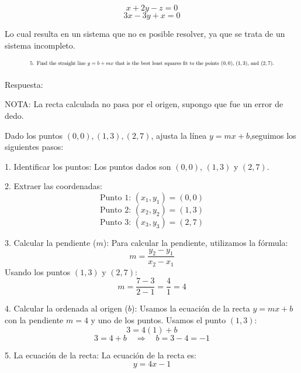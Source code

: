 \documentclass[12pt]{report}
\begin{document}
\[
x + 2y - z = 0
\]
\[
3x - 3y + x = 0
\]

Lo cual resulta en un sistema que no es posible resolver, ya que se trata de un sistema incompleto.



\begin{figure}[H]
	\centering
	\includegraphics[width=1\textwidth]{inciso5}
\end{figure}
	Respuesta:
	
	NOTA: La recta calculada no pasa por el origen, supongo que fue un error de dedo.
	
	Dado los puntos \( (0, 0), (1, 3), (2, 7) \), ajusta la línea \( y = mx + b \),seguimos los siguientes pasos:
	
	1. Identificar los puntos: Los puntos dados son \((0,0)\), \((1,3)\) y \((2,7)\).
	
	2. Extraer las coordenadas:
	\[
	\text{Punto 1: } (x_1, y_1) = (0, 0)
	\]
	\[
	\text{Punto 2: } (x_2, y_2) = (1, 3)
	\]
	\[
	\text{Punto 3: } (x_3, y_3) = (2, 7)
	\]
	
	3. Calcular la pendiente (\(m\)):
	Para calcular la pendiente, utilizamos la fórmula:
	\[
	m = \frac{y_2 - y_1}{x_2 - x_1}
	\]
	Usando los puntos \((1,3)\) y \((2,7)\):
	\[
	m = \frac{7 - 3}{2 - 1} = \frac{4}{1} = 4
	\]
	
	4. Calcular la ordenada al origen (\(b\)):
	Usamos la ecuación de la recta \(y = mx + b\) con la pendiente \(m = 4\) y uno de los puntos. Usamos el punto \((1,3)\):
	\[
	3 = 4(1) + b
	\]
	\[
	3 = 4 + b \quad \Rightarrow \quad b = 3 - 4 = -1
	\]
	
	5. La ecuación de la recta:
	La ecuación de la recta es:
	\[
	y = 4x - 1
	\]
	
	
	
\end{document}
